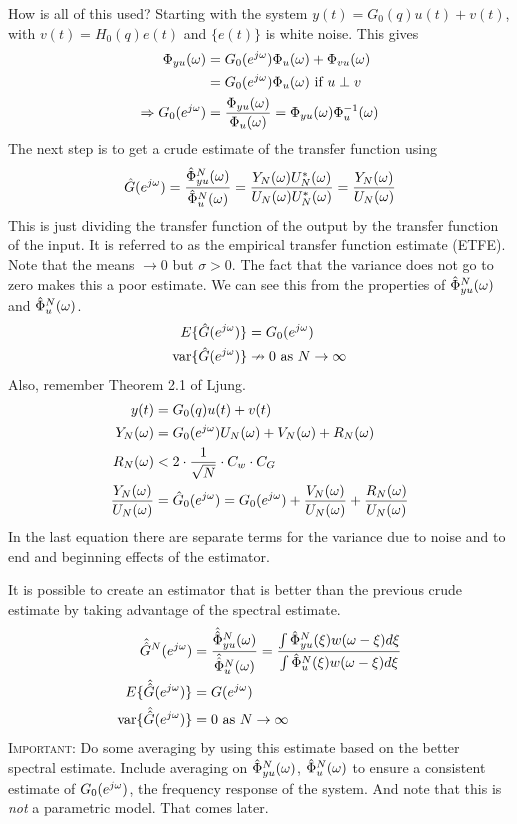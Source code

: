 How is all of this used? Starting with the system $y(t)=G_0(q)u(t)+v(t)$, with $v(t)=H_0(q)e(t)$ and $\{e(t)\}$ is white noise.
This gives
\begin{align*}
\Phi_{yu}(\omega) &= G_0(e^{j\omega})\Phi_u(\omega) + \Phi_{vu}(\omega) \\
&= G_0(e^{j\omega})\Phi_u(\omega) \text{~if~} u\perp v \\
\Rightarrow G_0(e^{j\omega}) &= \frac{\Phi_{yu}(\omega)}{\Phi_u(\omega)} = \Phi_{yu}(\omega)\Phi_u^{-1}(\omega)
\end{align*}
The next step is to get a crude estimate of the transfer function using
$$\hat{G}(e^{j\omega}) = \frac{\hat{\Phi}_{yu}^N (\omega)}{\hat{\Phi}_u^N (\omega)} = \frac{Y_N(\omega)U_N^*(\omega)}{U_N(\omega)U_N^*(\omega)} = \frac{Y_N(\omega)}{U_N(\omega)}$$
This is just dividing the transfer function of the output by the transfer function of the input.
It is referred to as the empirical transfer function estimate (ETFE).
Note that the means $\to 0$ but $\sigma>0$.
The fact that the variance does not go to zero makes this a poor estimate.
We can see this from the properties of $\hat{\Phi}_{yu}^N (\omega)$ and $\hat{\Phi}_u^N (\omega)$.
\begin{align*}
E\{\hat{G}(e^{j\omega})\} &= G_0(e^{j\omega}) \\
\text{var}\{\hat{G}(e^{j\omega})\} &\nrightarrow 0 \text{~as~} N\to\infty
\end{align*}
Also, remember Theorem 2.1 of Ljung.
\begin{align*}
y(t) &= G_0(q)u(t) + v(t) \\
Y_N(\omega) &= G_0(e^{j\omega})U_N(\omega) + V_N(\omega) + R_N(\omega) \\
R_N(\omega) &< 2\cdot \frac{1}{\sqrt{N}}\cdot C_w\cdot C_G \\
\frac{Y_N(\omega)}{U_N(\omega)} &= \hat{G}_0(e^{j\omega}) = G_0(e^{j\omega}) + \frac{V_N(\omega)}{U_N(\omega)} + \frac{R_N(\omega)}{U_N(\omega)}
\end{align*}
In the last equation there are separate terms for the variance due to noise and to end and beginning effects of the estimator.

It is possible to create an estimator that is better than the previous crude estimate by taking advantage of the spectral estimate.
\begin{align*}
\hat{\hat{G}}^N(e^{j\omega}) &= \frac{\hat{\hat{\Phi}}_{yu}^N (\omega)}{\hat{\hat{\Phi}}_u^N (\omega)} = \frac{\int\hat{\Phi}_{yu}^N(\xi)w(\omega-\xi)d\xi}{\int \hat{\Phi}_u^N(\xi)w(\omega-\xi)d\xi} \\
E\{\hat{\hat{G}} (e^{j\omega})\} &= G(e^{j\omega}) \\
\text{var}\{\hat{\hat{G}}(e^{j\omega})\} &= 0 \text{~as~} N\to\infty
\end{align*}
\textsc{Important:} Do some averaging by using this estimate based on the better spectral estimate.
Include averaging on $\hat{\Phi}_{yu}^N (\omega)$, $\hat{\Phi}_u^N (\omega)$ to ensure a consistent estimate of $G_0(e^{j\omega})$, the frequency response of the system.
And note that this is \textit{not} a parametric model.
That comes later.

